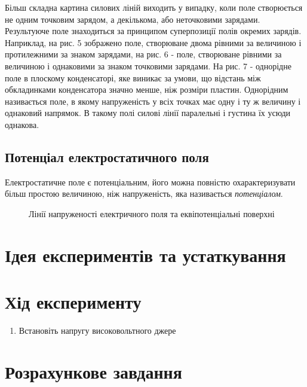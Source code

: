 \documentclass{LabWork}
\begin{document}
Більш складна картина силових ліній виходить у випадку, коли поле створюється не одним точковим зарядом, а декількома, або неточковими зарядами. Результуюче поле знаходиться за принципом суперпозиції полів окремих зарядів. Наприклад, на рис. 5 зображено поле, створюване двома рівними за величиною і протилежними за знаком зарядами, на рис. 6 - поле, створюване рівними за величиною і однаковими за знаком точковими зарядами. На рис. 7 - однорідне поле в плоскому конденсаторі, яке виникає за умови, що відстань між обкладинками конденсатора значно менше, ніж розміри пластин. Однорідним називається поле, в якому напруженість у всіх точках має одну і ту ж величину і однаковий напрямок. В такому полі силові лінії паралельні і густина їх усюди однакова.

\subsection{Потенціал електростатичного поля}

Електростатичне поле є потенціальним, його можна повністю охарактеризувати більш простою величиною, ніж напруженість, яка називається \emph{потенціалом}. 
\begin{wrapfigure}{O}{0.45\linewidth}\centering
{}
\caption{Лінії напруженості електричного поля та еквіпотенціальні поверхні}
\label{pic:philines}
\end{wrapfigure}

\section{Ідея експериментів та устаткування}



\section{Хід експерименту}

\begin{enumerate}
\item Встановіть напругу високовольтного джере
\end{enumerate}

\section*{Розрахункове завдання}
\end{document}
